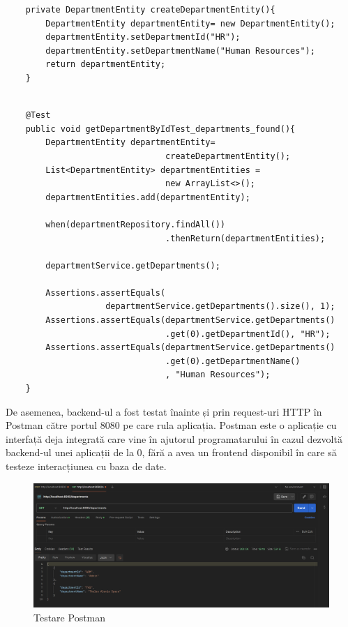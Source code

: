 \begin{center}
\begin{minipage}{0.9\textwidth}
\captionsetup{type=listing}
   \begin{lstlisting}
    private DepartmentEntity createDepartmentEntity(){
        DepartmentEntity departmentEntity= new DepartmentEntity();
        departmentEntity.setDepartmentId("HR");
        departmentEntity.setDepartmentName("Human Resources");
        return departmentEntity;
    }
    
    \end{lstlisting} 
\end{minipage}
\end{center}

\begin{center}
\begin{minipage}{0.9\textwidth}
\captionsetup{type=listing}
   \begin{lstlisting}
    @Test
    public void getDepartmentByIdTest_departments_found(){
        DepartmentEntity departmentEntity= 
                                createDepartmentEntity();
        List<DepartmentEntity> departmentEntities = 
                                new ArrayList<>();
        departmentEntities.add(departmentEntity);

        when(departmentRepository.findAll())
                                .thenReturn(departmentEntities);

        departmentService.getDepartments();

        Assertions.assertEquals(
                    departmentService.getDepartments().size(), 1);
        Assertions.assertEquals(departmentService.getDepartments()
                                .get(0).getDepartmentId(), "HR");
        Assertions.assertEquals(departmentService.getDepartments()
                                .get(0).getDepartmentName()
                                , "Human Resources");
    }
    \end{lstlisting} 
\end{minipage}
\end{center}

De asemenea, backend-ul a fost testat înainte și prin request-uri HTTP în Postman către portul 8080 pe care rula aplicația. Postman este o aplicație cu interfață deja integrată care vine în ajutorul programatarului în cazul dezvoltă backend-ul unei aplicații de la 0, fără a avea un frontend disponibil în care să testeze interacțiunea cu baza de date.

\begin{figure}[!htb]
    \centering
    \includegraphics[width=0.9\linewidth]{images/postman.png}
    \caption{Testare Postman}
    \label{fig:postman}
\end{figure}
